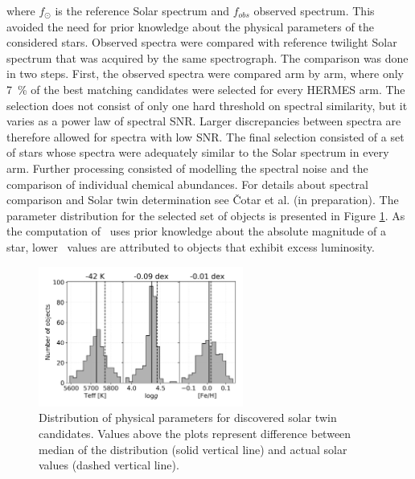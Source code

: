 where $f_{\odot}$ is the reference Solar spectrum and $f_{obs}$ observed spectrum. This avoided the need for prior knowledge about the physical parameters of the considered stars. Observed spectra were compared with reference twilight Solar spectrum that was acquired by the same spectrograph. The comparison was done in two steps. First, the observed spectra were compared arm by arm, where only 7~\% of the best matching candidates were selected for every HERMES arm. The selection does not consist of only one hard threshold on spectral similarity, but it varies as a power law of spectral SNR. Larger discrepancies between spectra are therefore allowed for spectra with low SNR. The final selection consisted of a set of stars whose spectra were adequately similar to the Solar spectrum in every arm. Further processing consisted of modelling the spectral noise and the comparison of individual chemical abundances. For details about spectral comparison and Solar twin determination see \v{C}otar et al. (in preparation). The parameter distribution for the selected set of objects is presented in Figure \ref{fig:twins_stats}. As the computation of \Logg\ uses prior knowledge about the absolute magnitude of a star, lower \Logg\ values are attributed to objects that exhibit excess luminosity. 

\begin{figure}
	\centering
	\includegraphics[width=0.6\textwidth]{solar_twins_like_07_ebv_c3.png}
	\caption{Distribution of physical parameters for discovered solar twin candidates. Values above the plots represent difference between median of the distribution (solid vertical line) and actual solar values (dashed vertical line).}
	\label{fig:twins_stats}
\end{figure}

